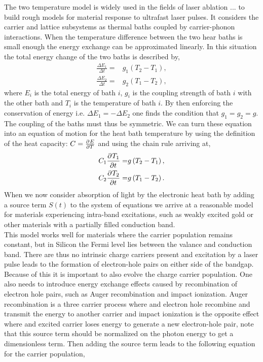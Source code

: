 The two temperature model is widely used in the fields of laser ablation ... to build rough models for material response to ultrafast laser pulses. It considers the carrier and lattice subsystems as thermal baths coupled by carrier-phonon interactions. When the temperature difference between the two hear baths is small enough the energy exchange can be approximated linearly. In this situation the total energy change of the two baths is described by,
\begin{align}
  \frac{\Delta E_1}{\Delta t}=&g_1\left(T_2-T_1\right),\\
  \frac{\Delta E_2}{\Delta t}=&g_2\left(T_1-T_2\right),
\end{align}
where $E_i$ is the total energy of bath $i$, $g_i$ is the coupling strength of bath $i$ with the other bath and $T_i$ is the temperature of bath $i$. By then enforcing the conservation of energy i.e. $\Delta E_1=-\Delta E_2$ one finds the condition that $g_1=g_2=g$. The coupling of the baths must thus be symmetric. We can turn these equation into an equation of motion for the heat bath temperature by using the definition of the heat capacity: $C=\pdv[]{E}{T}$ and using the chain rule arriving at,
\begin{align}
  C_1\pdv[]{T_1}{t}=&g\left(T_2-T_1\right),\\
  C_2\pdv[]{T_2}{t}=&g\left(T_1-T_2\right).
\end{align}
When we now consider absorption of light by the electronic heat bath by adding a source term $S(t)$ to the system of equations we arrive at a reasonable model for materials experiencing intra-band excitations, such as weakly excited gold or other materials with a partially filled conduction band.\\
This model works well for materials where the carrier population remains constant, but in Silicon the Fermi level lies between the valance and conduction band. There are thus no intrinsic charge carriers present and excitation by a laser pulse leads to the formation of electron-hole pairs on either side of the bandgap. Because of this it is important to also evolve the charge carrier population. One also needs to introduce energy exchange effects caused by recombination of electron hole pairs, such as Auger recombination and impact ionization. Auger recombination is a three carrier process where and electron hole recombine and transmit the energy to another carrier and impact ionization is the opposite effect where and excited carrier loses energy to generate a new electron-hole pair, note that this source term should be normalized on the photon energy to get a dimensionless term. Then adding the source term leads to the following equation for the carrier population,
